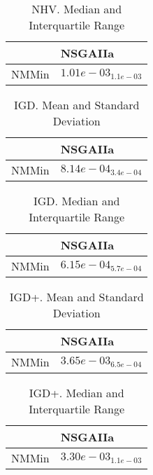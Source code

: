 \documentclass{article}
\begin{document}
\begin{table}
\caption{NHV. Median and Interquartile Range}
\label{table: NHV}
\centering
\begin{scriptsize}
\begin{tabular}{ll}
\hline &  NSGAIIa\\
\hline 
NMMin & \cellcolor{gray95}$  1.01e-03_{ 1.1e-03}$ \\
\hline
\end{tabular}
\end{scriptsize}
\end{table}

\begin{table}
\caption{IGD. Mean and Standard Deviation}
\label{table: IGD}
\centering
\begin{scriptsize}
\begin{tabular}{ll}
\hline &  NSGAIIa\\
\hline 
NMMin & \cellcolor{gray95}$  8.14e-04_{ 3.4e-04}$ \\
\hline
\end{tabular}
\end{scriptsize}
\end{table}

\begin{table}
\caption{IGD. Median and Interquartile Range}
\label{table: IGD}
\centering
\begin{scriptsize}
\begin{tabular}{ll}
\hline &  NSGAIIa\\
\hline 
NMMin & \cellcolor{gray95}$  6.15e-04_{ 5.7e-04}$ \\
\hline
\end{tabular}
\end{scriptsize}
\end{table}

\begin{table}
\caption{IGD+. Mean and Standard Deviation}
\label{table: IGD+}
\centering
\begin{scriptsize}
\begin{tabular}{ll}
\hline &  NSGAIIa\\
\hline 
NMMin & \cellcolor{gray95}$  3.65e-03_{ 6.5e-04}$ \\
\hline
\end{tabular}
\end{scriptsize}
\end{table}

\begin{table}
\caption{IGD+. Median and Interquartile Range}
\label{table: IGD+}
\centering
\begin{scriptsize}
\begin{tabular}{ll}
\hline &  NSGAIIa\\
\hline 
NMMin & \cellcolor{gray95}$  3.30e-03_{ 1.1e-03}$ \\
\hline
\end{tabular}
\end{scriptsize}
\end{table}
\end{document}
